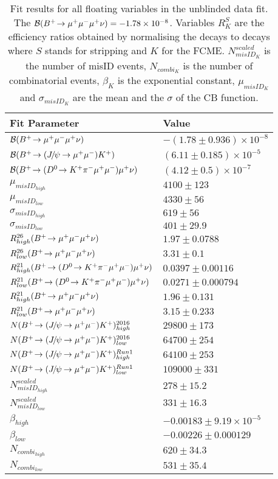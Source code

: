\begin{table}[H]
\centering
\small
\begin{tabular}{| l  l | }
\hline
Fit Parameter & Value  \\ \hline
$ \mathcal{B}(\Bmumumu) $ & $-(1.78 \pm 0.936)\times 10^{-8}$ \\
$ \mathcal{B}(\bjpsimumuk) $ & $(6.11 \pm 0.185)\times 10^{-5}$ \\
$ \mathcal{B}(\pr) $ & $(4.12 \pm 0.5)\times 10^{-7}$ \\
$ \mu_{misID_{high}} $ & $4100 \pm 123$ \\
$ \mu_{misID_{low}} $ & $4330 \pm 56$ \\
$ \sigma_{misID_{high}} $ & $619 \pm 56$ \\
$ \sigma_{misID_{low}} $ & $401 \pm 29.9$ \\
$ R^{26}_{high}(\Bmumumu) $ & $1.97 \pm 0.0788$ \\
$ R^{26}_{low}(\Bmumumu) $ & $3.31 \pm 0.1$ \\
$ R^{21}_{high}(\pr) $ & $0.0397 \pm 0.00116$ \\
$ R^{21}_{low}(\pr) $ & $0.0271 \pm 0.000794$ \\
$ R^{21}_{high}(\Bmumumu) $ & $1.96 \pm 0.131$ \\
$ R^{21}_{low}(\Bmumumu) $ & $3.15 \pm 0.233$ \\
$ N(\bjpsimumuk)^{2016}_{high} $ & $29800 \pm 173$ \\
$ N(\bjpsimumuk)^{2016}_{low} $ & $64700 \pm 254$ \\
$ N(\bjpsimumuk)^{Run 1}_{high} $ & $64100 \pm 253$ \\
$ N(\bjpsimumuk)^{Run 1}_{low} $ & $109000 \pm 331$ \\
$ N^{scaled}_{misID_{high}} $ & $278 \pm 15.2$ \\
$ N^{scaled}_{misID_{low}} $ & $331 \pm 16.3$ \\
$ \beta_{high} $ & $-0.00183 \pm 9.19\times 10^{-5}$ \\
$ \beta_{low} $ & $-0.00226 \pm 0.000129$ \\
$ N_{combi_{high}} $ & $620 \pm 34.3$ \\
$ N_{combi_{low}} $ & $531 \pm 35.4$ \\
\hline
\end{tabular}
\caption{Fit results for all floating variables in the unblinded data fit. The $\mathcal{B}(\Bmumumu) =-1.78\times 10^{-8}$. Variables $R^{S}_{K}$ are the efficiency ratios obtained by normalising the decays to \bjpsimumuk decays where $S$ stands for stripping and $K$ for the FCME. $N^{scaled}_{misID_{K}}$ is the number of misID events, $N_{combi_{K}}$ is the number of combinatorial events, $\beta_{K}$ is the exponential constant, $\mu_{misID_{K}}$ and $\sigma_{misID_{K}}$ are the mean and the $\sigma$ of the CB function.}
\label{tab:floatingparsummary_fit}
\end{table}

